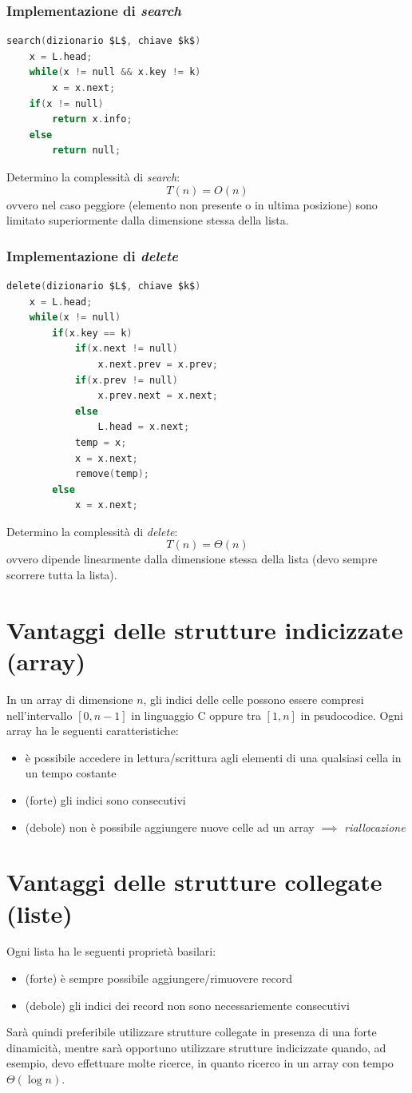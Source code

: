 \documentclass[italian]{article}
\newcommand{\varOmicron}{O}
\begin{document}
\subsubsection{Implementazione di \textit{search}}
\begin{lstlisting}[language=c,mathescape=true]
search(dizionario $L$, chiave $k$)
	x = L.head;
	while(x != null && x.key != k)
		x = x.next;
	if(x != null)
		return x.info;
	else
		return null;
\end{lstlisting}
Determino la complessità di \textit{search}:
\[
	T(n) = \varOmicron(n)
\]
ovvero nel caso peggiore (elemento non presente o in ultima posizione) sono limitato superiormente dalla dimensione stessa della lista.
\subsubsection{Implementazione di \textit{delete}}
\begin{lstlisting}[language=c,mathescape=true]
delete(dizionario $L$, chiave $k$)
	x = L.head;
	while(x != null)
		if(x.key == k)
			if(x.next != null)
				x.next.prev = x.prev;
			if(x.prev != null)
				x.prev.next = x.next;
			else
				L.head = x.next;
			temp = x;
			x = x.next;
			remove(temp);
		else
			x = x.next;
\end{lstlisting}
Determino la complessità di \textit{delete}:
\[
	T(n) = \varTheta(n)
\]
ovvero dipende linearmente dalla dimensione stessa della lista (devo sempre scorrere tutta la lista).

\section{Vantaggi delle strutture indicizzate (array)}
In un array di dimensione $n$, gli indici delle celle possono essere compresi nell'intervallo $[0,n-1]$ in linguaggio C oppure tra $[1,n]$ in psudocodice. Ogni array ha le seguenti caratteristiche:
\begin{itemize}
	\item è possibile accedere in lettura/scrittura agli elementi di una qualsiasi cella in un tempo costante
	\item (forte) gli indici sono consecutivi
	\item (debole) non è possibile aggiungere nuove celle ad un array $\implies$ \textit{riallocazione}
\end{itemize}
\section{Vantaggi delle strutture collegate (liste)}
Ogni lista ha le seguenti proprietà basilari:
\begin{itemize}
	\item (forte) è sempre possibile aggiungere/rimuovere record
	\item (debole) gli indici dei record non sono necessariemente consecutivi
\end{itemize}
Sarà quindi preferibile utilizzare strutture collegate in presenza di una forte dinamicità, mentre sarà opportuno utilizzare strutture indicizzate quando, ad esempio, devo effettuare molte ricerce, in quanto ricerco in un array con tempo $\varTheta(\log n)$.
\pagebreak
\end{document}
